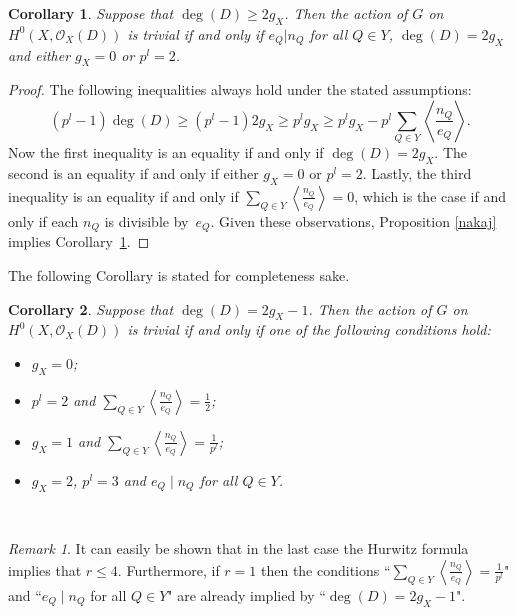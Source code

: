 \documentclass[11pt]{article} %
\newtheorem{cor}{Corollary}
\theoremstyle{remark}\newtheorem*{rem}{Remark}
\begin{document}
  \begin{cor}\label{this}
    Suppose that $\deg(D)\geq 2g_X$. Then the action of $G$ on $H^0(X,\mathscr{O}_X(D))$ is trivial if and 
    only if $e_Q | n_Q$ for all $Q\in Y$, $\deg(D)=2g_X$ and either $g_X=0$ or $p^l=2$.
  \end{cor}
  \begin{proof}
    The following inequalities always hold under the stated assumptions:
      \[
	(p^l-1)\deg(D)\geq (p^l-1)2g_X \geq p^lg_X \geq p^lg_X-p^l\sum_{Q\in Y}\left\langle\frac{n_Q}{e_Q}\right\rangle.
      \]
    Now the first inequality is an equality if and only if $\deg(D)=2g_X$. 
    The second is an equality if and only if either $g_X=0$ or $p^l=2$. 
    Lastly, the third inequality is an equality if and only if $\sum_{Q\in Y}\left\langle\frac{n_Q}{e_Q}\right\rangle=0$, which is the case if and only if each $n_Q$ is divisible by~$e_Q$. 
    Given these observations, Proposition \ref{nakaj} implies Corollary~\ref{this}.
  \end{proof}
    
The following Corollary is stated for completeness sake.\\

  \begin{cor}
    Suppose that $\deg(D)= 2g_X-1$. Then the action of $G$ on $H^0(X,\mathscr{O}_X(D))$ is trivial if and only if one of the following conditions hold:
      \begin{itemize}
	\item $g_X=0$;
	\item  $p^l=2$ and $\sum_{Q\in Y}\left\langle\frac{n_Q}{e_Q}\right\rangle=\frac{1}{2}$;
	\item  $g_X=1$ and $\sum_{Q\in Y}\left\langle\frac{n_Q}{e_Q}\right\rangle=\frac{1}{p^l}$;
	\item  $g_X=2$, $p^l=3$ and $e_Q\mid n_Q$ for all $Q\in Y$.
      \end{itemize}
  \end{cor}~


  \begin{rem}
    It can easily be shown that in the last case the Hurwitz formula implies that $r\leq 4$. 
    Furthermore, if $r=1$ then the conditions ``$\sum_{Q\in Y}\left\langle\frac{n_Q}{e_Q}\right\rangle=\frac{1}{p^l}$" and ``$e_Q\mid n_Q$ for all $Q\in Y$" are already implied by ``$\deg(D)=2g_X-1$".
  \end{rem}
\end{document}
